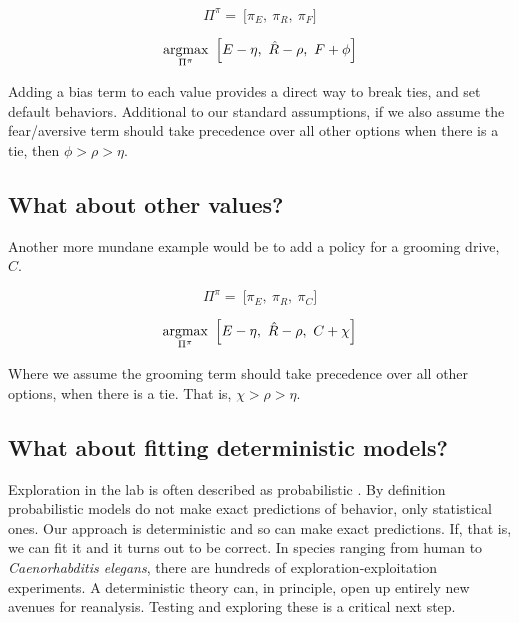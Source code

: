 \begin{equation}
\label{eq:pipi_f} 
\Pi^{\pi} = \ \Big [ \pi_E,\ \pi_R,\ \pi_F \Big ]
\end{equation}

\begin{equation}
\label{eq:meta_greedy_f} 
	\operatorname*{argmax}_{\Pi^{\pi}} \ \Big [ E - \eta,\ \hat R - \rho,\ F + \phi \Big ]
\end{equation}

Adding a bias term to each value provides a direct way to break ties, and set default behaviors. Additional to our standard assumptions, if we also assume the fear/aversive term should take precedence over all other options when there is a tie, then $\phi > \rho > \eta$.

\subsection*{What about other values?}
Another more mundane example would be to add a policy for a grooming drive, $C$. 

\begin{equation}
\label{eq:pipi_c} 
\Pi^{\pi} = \ \Big [ \pi_E,\ \pi_R,\ \pi_C \Big ]
\end{equation}

\begin{equation}
\label{eq:meta_greedy_c} 
\operatorname*{argmax}_{\Pi^{\pi}} \ \Big [ E - \eta,\ \hat R - \rho,\ C + \chi \Big ]
\end{equation}

Where we assume the grooming term should take precedence over all other options, when there is a tie. That is, $\chi > \rho > \eta$.

\subsection*{What about fitting deterministic models?}
Exploration in the lab is often described as probabilistic \citep{Calhoun2014,Song2019a,Gershman2018b,Schulz2018a}. By definition probabilistic models do not make exact predictions of behavior, only statistical ones. Our approach is deterministic and so can make exact predictions. If, that is, we can fit it and it turns out to be correct. In species ranging from human to \textit{Caenorhabditis elegans}, there are hundreds of exploration-exploitation experiments. A deterministic theory can, in principle, open up entirely new avenues for reanalysis. Testing and exploring these is a critical next step.


